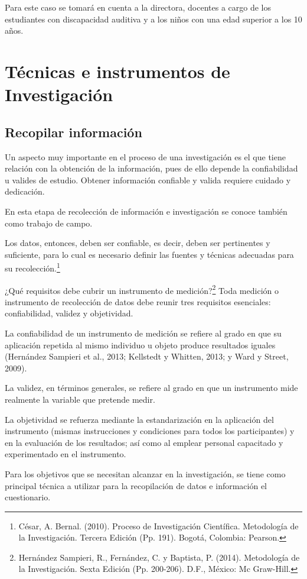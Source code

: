 \documentclass[12pt]{report}%
\begin{document}
Para este caso se tomará en cuenta a la directora, docentes a cargo de los estudiantes con discapacidad auditiva y a los niños con una edad superior a los 10 años.

\section{Técnicas e instrumentos de Investigación}
\subsection{Recopilar información}
Un aspecto muy importante en el proceso de una investigación es el que tiene relación con la obtención de la información, pues de ello depende la confiabilidad u valides de estudio. Obtener información confiable y valida requiere cuidado y dedicación.

En esta etapa de recolección de información e investigación se conoce también como trabajo de campo.
 
Los datos, entonces, deben ser confiable, es decir, deben ser pertinentes y suficiente, para lo cual es necesario definir las fuentes y técnicas adecuadas para su recolección.\footnote{César, A. Bernal. (2010). Proceso de Investigación Científica. Metodología de la Investigación. Tercera Edición (Pp. 191). Bogotá, Colombia: Pearson.}

¿Qué requisitos debe cubrir un instrumento de medición?\footnote{Hernández Sampieri, R., Fernández, C. y  Baptista, P. (2014). Metodología de la Investigación. Sexta Edición (Pp. 200-206). D.F., México: Mc Graw-Hill.}
Toda medición o instrumento de recolección de datos debe reunir tres requisitos esenciales: confiabilidad, validez y objetividad.

La confiabilidad de un instrumento de medición se refiere al grado en que su aplicación repetida al mismo individuo u objeto produce resultados iguales (Hernández Sampieri et al., 2013; Kellstedt y Whitten, 2013; y Ward y Street, 2009).

La validez, en términos generales, se refiere al grado en que un instrumento mide realmente la variable que pretende medir.

La objetividad se refuerza mediante la estandarización en la aplicación del instrumento (mismas instrucciones y condiciones para todos los participantes) y en la evaluación de los resultados; así como al emplear personal capacitado y experimentado en el instrumento.

Para los objetivos que se necesitan alcanzar en la investigación, se tiene como principal técnica a utilizar para la recopilación de datos e información el cuestionario.
\end{document}
